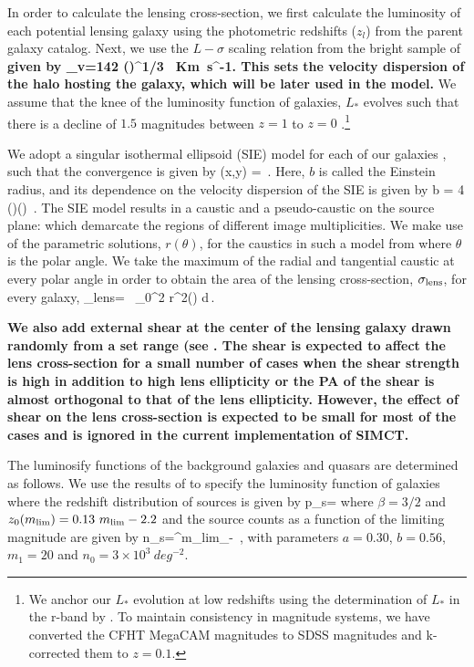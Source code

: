 \documentclass[useAMS,usenatbib,a4paper]{mn2e}
\begin{document}
In order to calculate the lensing cross-section, we first calculate the
luminosity of each potential lensing galaxy using the photometric redshifts
($z_l$) from the parent galaxy catalog. Next, we use the $L-\sigma$ scaling relation from the
bright sample of \citep{Parker2005} {\bf given by 
\be
\label{magstar2}
\sigma_v=142 \left(\right)^{1/3} \, Km~s^{-1}.
\ee
This sets the velocity dispersion of the halo
hosting the galaxy, which will be later used in the model.}
We assume that the knee of the luminosity function of galaxies, $L_*$ evolves
such that there is a decline of $1.5$ magnitudes between $z=1$ to $z=0$
\citep{Faber2007}.\footnote{We anchor our $L_*$ evolution at low redshifts using the
determination of $L_*$ in the r-band by \citet{Blanton2001}. To maintain
consistency in magnitude systems, we have converted the CFHT MegaCAM magnitudes
to SDSS magnitudes and k-corrected them to $z=0.1$.}

We adopt a singular isothermal ellipsoid (SIE) model for each of our galaxies
\citep{Kormann1994}, such that the convergence is given by
\be
\kappa (x,y) =  \,.
\ee
Here, $b$ is called the Einstein radius, and its dependence on the velocity
dispersion of the SIE is given by
\be
b = 4\pi\,
\left(\right)\left(\right) \,.
\ee
The SIE model results in a caustic and a pseudo-caustic on the source
plane: which demarcate the regions of different image multiplicities. We
make use of the parametric solutions, $r(\theta)$, for the caustics in
such a model from \citet{Keeton2000b} where $\theta$ is the polar angle.
We take the maximum of the radial and tangential caustic at every polar
angle in order to obtain the area of the lensing cross-section,
$\sigma_{\rm lens}$, for every galaxy,
\be
\sigma_{\rm lens}= \, \int_0^{2\pi} r^2(\theta) d\theta \,.
\ee

{\bf We also add external shear at the center of the lensing galaxy
drawn randomly from a set range (see . The shear is
expected to affect the lens cross-section for a small number of cases
when the shear strength is high in addition to high lens ellipticity or
the PA of the shear is almost orthogonal to that of the lens
ellipticity. However, the effect of shear on the lens cross-section is
expected to be small for most of the cases and is ignored in the current
implementation of SIMCT.}

The luminosify functions of the background galaxies and quasars are
determined as follows. We use the results of \citet{Faure2009} to specify the luminosity
function of galaxies where the redshift distribution of sources is
given by
\be
\label{eqn:ps}
p_s=
\ee
where $\beta=3/2$ and $z_0(m_{\rm lim})=0.13~m_{\rm lim} - 2.2$ and the source
counts as a function of the limiting magnitude are given by
\be
\label{eqn:ns}
n_s=\int^{m_{\rm lim}}_{-\infty} 
\,,
\ee
with parameters $a=0.30$, $b=0.56$, $m_1=20$ and $n_0=3\times10^3~deg^{-2}$.
\end{document}
